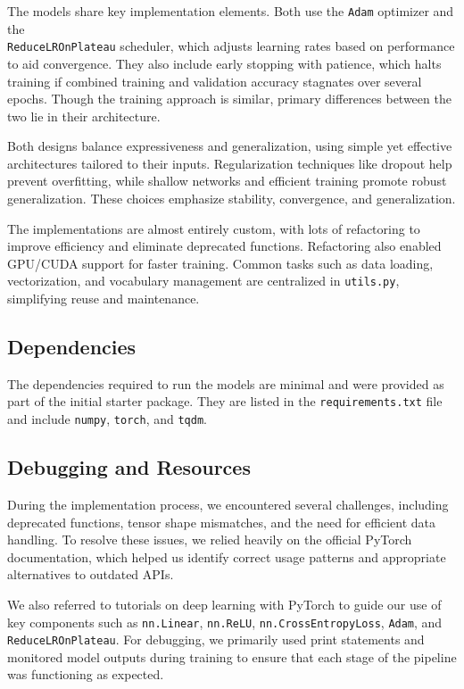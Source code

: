 \documentclass[a4paper]{article}
\begin{document}
The models share key implementation elements. Both use the \texttt{Adam} optimizer and the \\\texttt{ReduceLROnPlateau} scheduler, which adjusts learning rates based on performance to aid convergence. They also include early stopping with patience, which halts training if combined training and validation accuracy stagnates over several epochs. Though the training approach is similar, primary differences between the two lie in their architecture.

Both designs balance expressiveness and generalization, using simple yet effective architectures tailored to their inputs. Regularization techniques like dropout help prevent overfitting, while shallow networks and efficient training promote robust generalization. These choices emphasize stability, convergence, and generalization.

The implementations are almost entirely custom, with lots of refactoring to improve efficiency and eliminate deprecated functions. Refactoring also enabled GPU/CUDA support for faster training. Common tasks such as data loading, vectorization, and vocabulary management are centralized in \texttt{utils.py}, simplifying reuse and maintenance.


\subsection*{Dependencies}
The dependencies required to run the models are minimal and were provided as part of the initial starter package. They are listed in the \texttt{requirements.txt} file and include \texttt{numpy}, \texttt{torch}, and \texttt{tqdm}.


\subsection*{Debugging and Resources}
During the implementation process, we encountered several challenges, including deprecated functions, tensor shape mismatches, and the need for efficient data handling. To resolve these issues, we relied heavily on the official PyTorch documentation, which helped us identify correct usage patterns and appropriate alternatives to outdated APIs.

We also referred to tutorials on deep learning with PyTorch to guide our use of key components such as \texttt{nn.Linear}, \texttt{nn.ReLU}, \texttt{nn.CrossEntropyLoss}, \texttt{Adam}, and \texttt{ReduceLROnPlateau}. For debugging, we primarily used print statements and monitored model outputs during training to ensure that each stage of the pipeline was functioning as expected.
\end{document}
